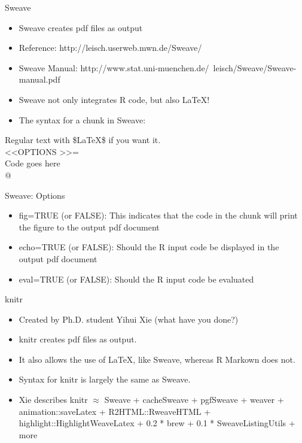 \begin{frame}{Sweave}
\begin{itemize}
\item Sweave creates pdf files as output
\item Reference: http://leisch.userweb.mwn.de/Sweave/
\item Sweave Manual: http://www.stat.uni-muenchen.de/~leisch/Sweave/Sweave-manual.pdf
\item Sweave not only integrates R code, but also LaTeX!
\item The syntax for a chunk in Sweave:
\end{itemize}
Regular text with \$LaTeX\$ if you want it.\\
\textless\textless OPTIONS \textgreater\textgreater=\\
Code goes here\\
@\\
\end{frame}

\begin{frame}{Sweave: Options}
\begin{itemize}
\item fig=TRUE (or FALSE): This indicates that the code in the chunk will print the figure to the output pdf document
\item echo=TRUE (or FALSE): Should the R input code be displayed in the output pdf document
\item eval=TRUE (or FALSE): Should the R input code be evaluated
\end{itemize}
\end{frame}



\begin{frame}{knitr}
\begin{itemize}
\item Created by Ph.D. student Yihui Xie (what have you done?) 
\item knitr creates pdf files as output.
\item It also allows the use of LaTeX, like Sweave, whereas R Markown does not.  
\item Syntax for knitr is largely the same as Sweave.
\item Xie describes knitr $\approx$ Sweave + cacheSweave + pgfSweave + weaver + animation::saveLatex + R2HTML::RweaveHTML + highlight::HighlightWeaveLatex + 0.2 * brew + 0.1 * SweaveListingUtils + more
\end{itemize}
\end{frame}


